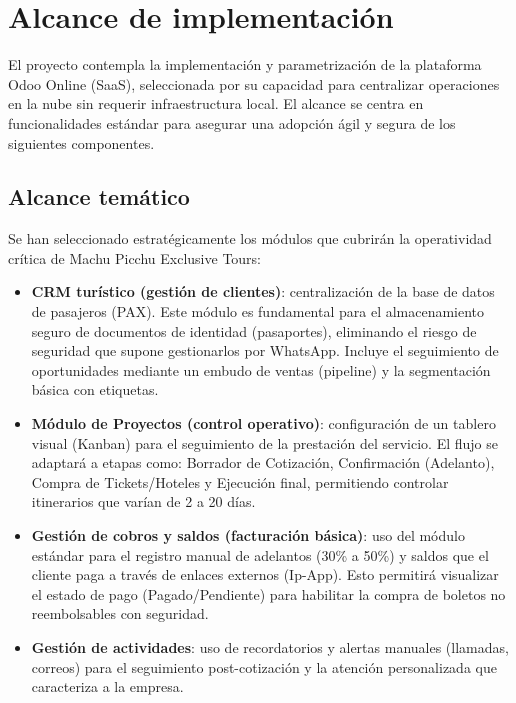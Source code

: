 \section{Alcance de implementación}

El proyecto contempla la implementación y parametrización de la plataforma Odoo Online (SaaS), seleccionada por su capacidad para centralizar operaciones en la nube sin requerir infraestructura local. El alcance se centra en funcionalidades estándar para asegurar una adopción ágil y segura de los siguientes componentes.

\subsection{Alcance temático}

\begin{indentedsubsection}
Se han seleccionado estratégicamente los módulos que cubrirán la operatividad crítica de Machu Picchu Exclusive Tours:

\begin{itemize}
    \item[a.] \textbf{CRM turístico (gestión de clientes)}: centralización de la base de datos de pasajeros (PAX). Este módulo es fundamental para el almacenamiento seguro de documentos de identidad (pasaportes), eliminando el riesgo de seguridad que supone gestionarlos por WhatsApp. Incluye el seguimiento de oportunidades mediante un embudo de ventas (pipeline) y la segmentación básica con etiquetas.
    \item[b.] \textbf{Módulo de Proyectos (control operativo)}: configuración de un tablero visual (Kanban) para el seguimiento de la prestación del servicio. El flujo se adaptará a etapas como: Borrador de Cotización, Confirmación (Adelanto), Compra de Tickets/Hoteles y Ejecución final, permitiendo controlar itinerarios que varían de 2 a 20 días.
    \item[c.] \textbf{Gestión de cobros y saldos (facturación básica)}: uso del módulo estándar para el registro manual de adelantos (30\% a 50\%) y saldos que el cliente paga a través de enlaces externos (Ip-App). Esto permitirá visualizar el estado de pago (Pagado/Pendiente) para habilitar la compra de boletos no reembolsables con seguridad.
    \item[d.] \textbf{Gestión de actividades}: uso de recordatorios y alertas manuales (llamadas, correos) para el seguimiento post-cotización y la atención personalizada que caracteriza a la empresa.
\end{itemize}


\end{indentedsubsection}
